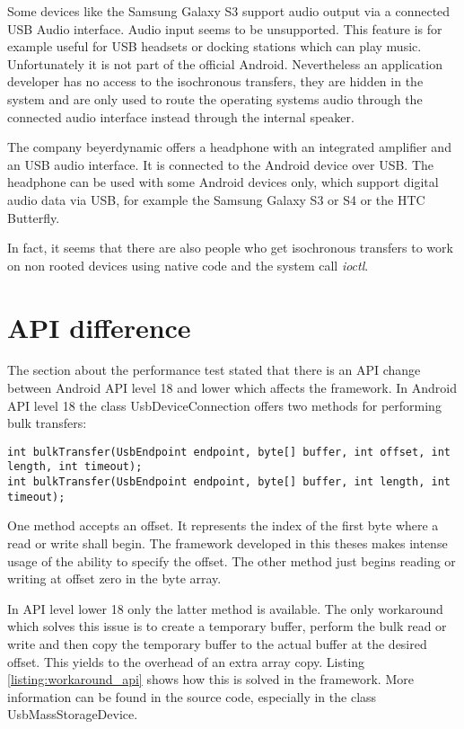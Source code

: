 Some devices like the Samsung Galaxy S3 support audio output via a connected USB Audio interface. Audio input seems to be unsupported. This feature is for example useful for USB headsets or docking stations which can play music. Unfortunately it is not part of the official Android. Nevertheless an application developer has no access to the isochronous transfers, they are hidden in the system and are only used to route the operating systems audio through the connected audio interface instead through the internal speaker.

The company beyerdynamic offers a headphone with an integrated amplifier and an USB audio interface. It is connected to the Android device over USB. The headphone can be used with some Android devices only, which support digital audio data via USB, for example the Samsung Galaxy S3 or S4 or the HTC Butterfly\cite{beyerdynamic}.

In fact, it seems that there are also people who get isochronous transfers to work on non rooted devices using native code and the system call \textit{ioctl}\cite{usb_audio_recorder, iso_stack}.

\chapter{API difference}
\label{chapter:api_diff}

The section about the performance test stated that there is an API change between Android API level 18 and lower which affects the framework. In Android API level 18 the class UsbDeviceConnection offers two methods for performing bulk transfers\cite{android_usb_dev_con}:

\lstset{language=Java}
\begin{lstlisting}[caption=Bulk transfers in UsbDeviceConnection, label=listing:wifi_connectg]
int bulkTransfer(UsbEndpoint endpoint, byte[] buffer, int offset, int length, int timeout);
int bulkTransfer(UsbEndpoint endpoint, byte[] buffer, int length, int timeout);
\end{lstlisting}

One method accepts an offset. It represents the index of the first byte where a read or write shall begin. The framework developed in this theses makes intense usage of the ability to specify the offset. The other method just begins reading or writing at offset zero in the byte array.

In API level lower 18 only the latter method is available. The only workaround which solves this issue is to create a temporary buffer, perform the bulk read or write and then copy the temporary buffer to the actual buffer at the desired offset. This yields to the overhead of an extra array copy. Listing \ref{listing:workaround_api} shows how this is solved in the framework. More information can be found in the source code, especially in the class \mbox{UsbMassStorageDevice}.

